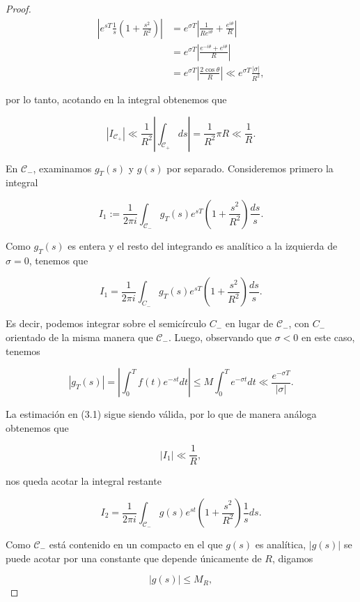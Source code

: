 \begin{proof}
\begin{equation}
    \begin{aligned}
    \left|e^{s T} \frac{1}{s}\left(1+\frac{s^2}{R^2}\right)\right| &= e^{\sigma T}\left|\frac{1}{R e^{i \theta}}+\frac{e^{i \theta}}{R}\right|\\
    &=e^{\sigma T}\left|\frac{e^{-i\theta}+e^{i\theta}}{R}\right|\\
    &=e^{\sigma T}\left|\frac{2 \cos \theta}{R}\right| \ll e^{\sigma T} \frac{|\sigma|}{R^2},
\end{aligned}
\end{equation}

por lo tanto, acotando en la integral obtenemos que

\[
\left|I_{\mathscr{C}_{+}}\right| \ll \frac{1}{R^2}\left|\int_{\mathscr{C}_{+}} d s\right|=\frac{1}{R^2}\pi R\ll \frac{1}{R}.
\]

En $\mathscr{C}_{-}$, examinamos $g_T(s)$ y $g(s)$ por separado. Consideremos primero la integral

\[
I_1 := \frac{1}{2 \pi i} \int_{\mathscr{C}_{-}} g_T(s) e^{s T}\left(1+\frac{s^2}{R^2}\right) \frac{d s}{s}.
\]

Como $g_T(s)$ es entera y el resto del integrando es analítico a la izquierda de $\sigma = 0$, tenemos que

\[
I_1 = \frac{1}{2 \pi i} \int_{C_{-}} g_T(s) e^{s T}\left(1+\frac{s^2}{R^2}\right) \frac{d s}{s}.
\] 

Es decir, podemos integrar sobre el semicírculo \( C_{-} \) en lugar de \( \mathscr{C}_{-} \), con \( C_{-} \) orientado de la misma manera que \( \mathscr{C}_{-} \). Luego, observando que \( \sigma < 0 \) en este caso, tenemos  

\[
\left|g_T(s)\right| = \left|\int_0^T f(t) e^{-s t} d t\right| \leq M \int_0^T e^{-\sigma t} d t \ll \frac{e^{-\sigma T}}{|\sigma|}.
\]

La estimación en (3.1) sigue siendo válida, por lo que de manera análoga obtenemos que

$$|I_{1}|\ll \frac{1}{R},$$

nos queda acotar la integral restante

$$I_2=\frac{1}{2\pi i }\int_{\mathscr{C}_-}g(s)e^{st}\left(1+\frac{s^2}{R^2}\right)\frac{1}{s}ds.$$

Como $\mathscr{C}_-$ está contenido en un compacto en el que $g(s)$ es analítica, $|g(s)|$ se puede acotar por una constante que depende únicamente de $R$, digamos 

$$|g(s)|\leq M_R,$$


\end{proof}
